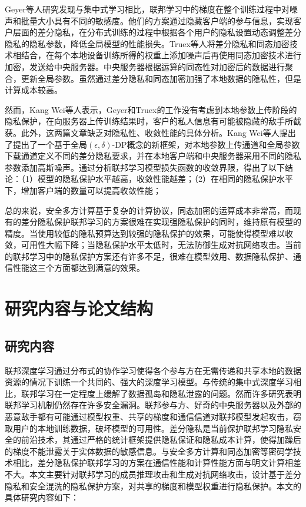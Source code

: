 Geyer等人研究发现与集中式学习相比，联邦学习中的梯度在整个训练过程中对噪声和批量大小具有不同的敏感度。他们的方案通过隐藏客户端的参与信息，实现客户层面的差分隐私，在分布式训练的过程中根据各个用户的隐私设置动态调整差分隐私的隐私参数，降低全局模型的性能损失。Truex等人将差分隐私和同态加密技术相结合，在每个本地设备训练所得的权重上添加噪声后再使用同态加密技术进行加密，发送给中央服务器。中央服务器根据运算的同态性对加密后的数据进行聚合，更新全局参数。虽然通过差分隐私和同态加密加强了本地数据的隐私性，但是计算成本较高。

然而，Kang Wei等人表示，Geyer和Truex的工作没有考虑到本地参数上传阶段的隐私保护，在向服务器上传训练结果时，客户的私人信息有可能被隐藏的敌手所截获。此外，这两篇文章缺乏对隐私性、收敛性能的具体分析。Kang Wei等人提出了提出了一个基于全局$(\epsilon, \delta)$-DP概念的新框架，对本地参数上传通道和全局参数下载通道定义不同的差分隐私要求，并在本地客户端和中央服务器采用不同的隐私参数添加高斯噪声。通过分析联邦学习模型损失函数的收敛界限，得出了以下结论：（1）模型的隐私保护水平越高，收敛性能越差；（2）在相同的隐私保护水平下，增加客户端的数量可以提高收敛性能；

总的来说，安全多方计算基于复杂的计算协议，同态加密的运算成本非常高，而现有的差分隐私保护联邦学习的方案很难在实现强隐私保护的同时，维持原有模型的精度。当使用较低的隐私预算达到较强的隐私保护的效果，可能使得模型难以收敛，可用性大幅下降；当隐私保护水平太低时，无法防御生成对抗网络攻击。当前的联邦学习中的隐私保护方案还有许多不足，很难在模型效用、数据隐私保护、通信性能这三个方面都达到满意的效果。

\section{研究内容与论文结构}
\subsection{研究内容}
联邦深度学习通过分布式的协作学习使得各个参与方在无需传递和共享本地的数据资源的情况下训练一个共同的、强大的深度学习模型。与传统的集中式深度学习相比，联邦学习在一定程度上缓解了数据孤岛和隐私泄露的问题。然而许多研究表明联邦学习机制仍然存在许多安全漏洞。联邦参与方、好奇的中央服务器以及外部的恶意敌手都有可能通过模型权重、共享的梯度和通信信道对联邦模型发起攻击，窃取用户的本地训练数据，破坏模型的可用性。差分隐私是当前保护联邦学习隐私安全的前沿技术，其通过严格的统计框架提供隐私保证和隐私成本计算，使得加躁后的梯度不能泄露关于实体数据的敏感信息。与安全多方计算和同态加密等密码学技术相比，差分隐私保护联邦学习的方案在通信性能和计算性能方面与明文计算相差不大。本文主要针对联邦学习的成员推理攻击和生成对抗网络攻击，设计基于差分隐私和安全混洗的隐私保护方案，对共享的梯度和模型权重进行隐私保护。本文的具体研究内容如下：

